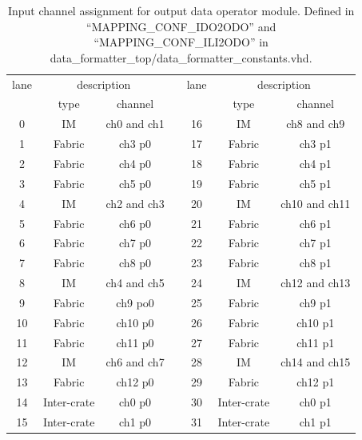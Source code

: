 \documentclass[11pt,letterpaper]{article}
\begin{document}
\begin{table}[h]
\centering
\begin{tabular}{|c|c|c|c|c|c|c|}
\cline{1-3} \cline{5-7}
lane & \multicolumn{2}{c|}{description} &  & lane & \multicolumn{2}{c|}{description} \\ \cline{1-3} \cline{5-7} 
     & type            & channel        &  &      & type           & channel         \\ \cline{1-3} \cline{5-7} 
0    & IM              & ch0 and ch1    &  & 16   & IM             & ch8 and ch9     \\ \cline{1-3} \cline{5-7} 
1    & Fabric          & ch3 p0         &  & 17   & Fabric         & ch3 p1          \\ \cline{1-3} \cline{5-7} 
2    & Fabric          & ch4 p0         &  & 18   & Fabric         & ch4 p1          \\ \cline{1-3} \cline{5-7} 
3    & Fabric          & ch5 p0         &  & 19   & Fabric         & ch5 p1          \\ \cline{1-3} \cline{5-7} 
4    & IM              & ch2 and ch3    &  & 20   & IM             & ch10 and ch11   \\ \cline{1-3} \cline{5-7} 
5    & Fabric          & ch6 p0         &  & 21   & Fabric         & ch6 p1          \\ \cline{1-3} \cline{5-7} 
6    & Fabric          & ch7 p0         &  & 22   & Fabric         & ch7 p1          \\ \cline{1-3} \cline{5-7} 
7    & Fabric          & ch8 p0         &  & 23   & Fabric         & ch8 p1          \\ \cline{1-3} \cline{5-7} 
8    & IM              & ch4 and ch5    &  & 24   & IM             & ch12 and ch13   \\ \cline{1-3} \cline{5-7} 
9    & Fabric          & ch9 po0        &  & 25   & Fabric         & ch9 p1          \\ \cline{1-3} \cline{5-7} 
10   & Fabric          & ch10 p0        &  & 26   & Fabric         & ch10 p1         \\ \cline{1-3} \cline{5-7} 
11   & Fabric          & ch11 p0        &  & 27   & Fabric         & ch11 p1         \\ \cline{1-3} \cline{5-7} 
12   & IM              & ch6 and ch7    &  & 28   & IM             & ch14 and ch15   \\ \cline{1-3} \cline{5-7} 
13   & Fabric          & ch12 p0        &  & 29   & Fabric         & ch12 p1         \\ \cline{1-3} \cline{5-7} 
14   & Inter-crate     & ch0 p0         &  & 30   & Inter-crate    & ch0 p1          \\ \cline{1-3} \cline{5-7} 
15   & Inter-crate     & ch1 p0         &  & 31   & Inter-crate    & ch1 p1          \\ \cline{1-3} \cline{5-7} 
\end{tabular}
\caption{Input channel assignment for output data operator module. Defined in 
``MAPPING\_CONF\_IDO2ODO'' and ``MAPPING\_CONF\_ILI2ODO'' in data\_formatter\_top/data\_formatter\_constants.vhd.}
\end{table}
\end{document}
